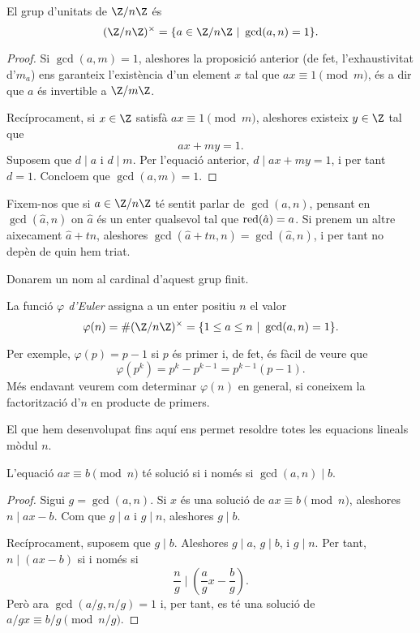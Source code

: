  \begin{corollary}[Unitats de $\Z/n\Z$]
 El grup d'unitats de $\Z/n\Z$ és
 \[
 (\Z/n\Z)^\times = \{ a\in\Z/n\Z ~|~ \gcd(a,n)=1\}.
 \]
 \end{corollary}
 \begin{proof}
  Si $\gcd(a,m)=1$, aleshores la proposició anterior (de fet, l'exhaustivitat d'$m_a$) ens garanteix l'existència d'un element $x$ tal que $ax\equiv 1\pmod{m}$, és a dir que $a$ és invertible a $\Z/m\Z$.
  
  Recíprocament, si $x\in\Z$ satisfà $ax\equiv 1\pmod{m}$, aleshores existeix $y\in\Z$ tal que
  \[
  ax+my = 1.
  \]
  Suposem que $d\mid a$ i $d\mid m$. Per l'equació anterior, $d\mid ax+my=1$, i per tant $d=1$. Concloem que $\gcd(a,m)=1$.
 \end{proof}
 
 \begin{remark}
 Fixem-nos que si $a\in\Z/n\Z$ té sentit parlar de $\gcd(a,n)$, pensant en $\gcd(\hat a,n)$ on $\hat a$ és un enter qualsevol tal que $\operatorname{red}(\hat a)=a$. Si prenem un altre aixecament $\hat a+ tn$, aleshores $\gcd(\hat a+tn,n)=\gcd(\hat a,n)$, i per tant no depèn de quin hem triat.
 \end{remark}
 Donarem un nom al cardinal d'aquest grup finit.
 \begin{definition}
 La funció \emph{$\varphi$ d'Euler} assigna a un enter positiu $n$ el valor
 \[
 \varphi(n)=\#(\Z/n\Z)^\times=\{1\leq a\leq n~|~ \gcd(a,n)=1\}.
 \]
 \end{definition}
 Per exemple, $\varphi(p) = p-1$ si $p$ és primer i, de fet, és fàcil de veure que
 \[
 \varphi(p^k) = p^k - p^{k-1} = p^{k-1}(p-1).
 \]
 Més endavant veurem com determinar $\varphi(n)$ en general, si coneixem la factorització d'$n$ en producte de primers.
 
 El que hem desenvolupat fins aquí ens permet resoldre totes les equacions lineals mòdul $n$.
 
 \begin{proposition}
 \label{prop:eqslineals}
 L'equació $ax\equiv b\pmod n$ té  solució si i només si $\gcd(a,n)\mid b$.
 \end{proposition}
 \begin{proof}
  Sigui $g=\gcd(a,n)$. Si $x$ és una solució de $ax\equiv b\pmod n$, aleshores $n\mid ax-b$. Com que $g\mid a$ i $g\mid n$, aleshores $g\mid b$.
  
  Recíprocament, suposem que $g\mid b$. Aleshores $g\mid a$, $g\mid b$, i $g\mid n$. Per tant, $n\mid (ax-b)$ si i només si
  \[
  \frac n g\mid \left(\frac a g x - \frac b g\right).
  \]
  Però ara $\gcd(a/g,n/g)=1$ i, per tant, es té una solució de $a/g x \equiv b/g \pmod{n/g}$.
 \end{proof}

